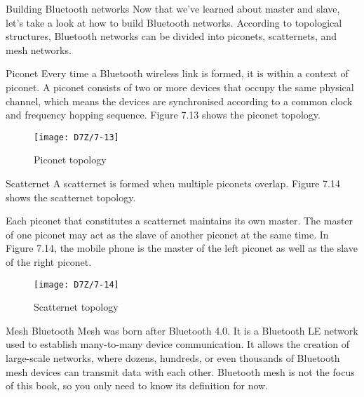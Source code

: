\documentclass[a4paper,12pt]{book}
\begin{document}
\begin{term}{Building Bluetooth networks}
    Now that we’ve learned about master and slave, let’s take a look at how to build Bluetooth networks. According to topological structures, Bluetooth networks can be divided into piconets, scatternets, and mesh networks.

    \parskip 6pt
    \begin{secterm}{Piconet}
        Every time a Bluetooth wireless link is formed, it is within a context of piconet. A piconet consists of two or more devices that occupy the same physical channel, which means the devices are synchronised according to a common clock and frequency hopping sequence. Figure 7.13 shows the piconet topology.

        \begin{figure}[!h]
            \centering
            \texttt{[image: D7Z/7-13]}
            \caption{Piconet topology}
        \end{figure}
    \end{secterm}

    \begin{secterm}{Scatternet}
        A scatternet is formed when multiple piconets overlap. Figure 7.14 shows the scatternet topology.

        \vspace{6pt}
        Each piconet that constitutes a scatternet maintains its own master. The master of one piconet may act as the slave of another piconet at the same time. In Figure 7.14, the mobile phone is the master of the left piconet as well as the slave of the right piconet.

        \begin{figure}[!h]
            \centering
            \texttt{[image: D7Z/7-14]}
            \caption{Scatternet topology}
        \end{figure}
    \end{secterm}

    \begin{secterm}{Mesh}
        Bluetooth Mesh was born after Bluetooth 4.0. It is a Bluetooth LE network used to establish many-to-many device communication. It allows the creation of large-scale networks, where dozens, hundreds, or even thousands of Bluetooth mesh devices can transmit data with each other. Bluetooth mesh is not the focus of this book, so you only need to know its definition for now.
    \end{secterm}
\end{term}
\end{document}
